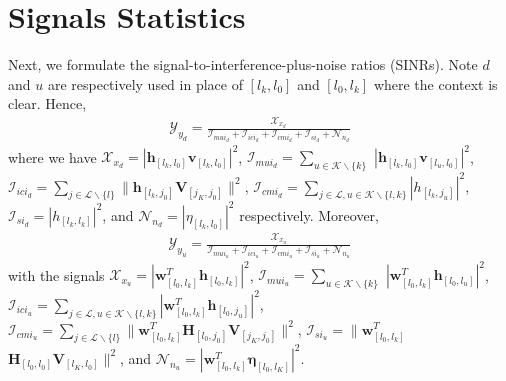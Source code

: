 \documentclass[onecolumn]{IEEEtran}
\begin{document}
\section{Signals Statistics}

Next, we formulate the signal-to-interference-plus-noise ratios (SINRs). Note $d$ and $u$ are respectively used in place of $[l_{k},l_{0}]$ and $[l_{0},l_{k}]$ where the context is clear. Hence,
\begin{align}
\mathcal{Y}_{y_{d}} = \frac{\mathcal{X}_{x_{d}}}{\mathcal{I}_{mui_{d}} + \mathcal{I}_{ici_{d}} + \mathcal{I}_{cmi_{d}} + \mathcal{I}_{si_{d}} + \mathcal{N}_{n_{d}}}
\end{align}
where we have $\mathcal{X}_{x_{d}} = | \boldsymbol{h}_{[l_{k},l_{0}]} \boldsymbol{v}_{[l_{k},l_{0}]} |^2$, $\mathcal{I}_{mui_{d}} = \sum_{u \in \mathcal{K} \backslash \{ k \}}$ $| \boldsymbol{h}_{[l_{k},l_{0}]} \boldsymbol{v}_{[l_{u},l_{0}]} |^2$, $\mathcal{I}_{ici_{d}} = 
\sum_{j \in \mathcal{L} \backslash \{ l \} } \| \boldsymbol{h}_{[l_{k},j_{0}]} \boldsymbol{V}_{[j_{K},j_{0}]} \|^2$, $\mathcal{I}_{cmi_{d}} =  \sum_{j \in \mathcal{L} , u \in \mathcal{K} \backslash \{ l,k \}} | h_{[l_{k},j_{u}]} |^2$, $\mathcal{I}_{si_{d}} =  | h_{[l_{k},l_{k}]} |^2$, and $\mathcal{N}_{n_{d}} = | \eta_{[l_{k},l_{0}]} |^{2}$ respectively. Moreover, 
\begin{align}
\mathcal{Y}_{y_{u}} = \frac{\mathcal{X}_{x_{u}}}{\mathcal{I}_{mui_{u}} + \mathcal{I}_{ici_{u}} + \mathcal{I}_{cmi_{u}} + \mathcal{I}_{si_{u}} + \mathcal{N}_{n_{u}}}
\end{align}
with the signals $\mathcal{X}_{x_{u}} =  | \boldsymbol{w}^{T}_{[l_{0},l_{k}]} \boldsymbol{h}_{[l_{0},l_{k}]} |^2$,
$\mathcal{I}_{mui_{u}} = \sum_{u \in \mathcal{K} \backslash \{ k \}}$ $| \boldsymbol{w}^{T}_{[l_{0},l_{k}]} \boldsymbol{h}_{[l_{0},l_{u}]} |^2$, $\mathcal{I}_{ici_{u}} = \sum_{j \in \mathcal{L}, u \in \mathcal{K} \backslash \{ l,k \}} | \boldsymbol{w}^{T}_{[l_{0},l_{k}]} \boldsymbol{h}_{[l_{0},j_{u}]} |^{2}$, $\mathcal{I}_{cmi_{u}} = \sum_{j \in \mathcal{L} \backslash \{ l \}} \| \boldsymbol{w}^{T}_{[l_{0},l_{k}]} \boldsymbol{H}_{[l_{0},j_{0}]} \boldsymbol{V}_{[j_{K},j_{0}]} \|^{2}$, $\mathcal{I}_{si_{u}} =  \| \boldsymbol{w}^{T}_{[l_{0},l_{k}]}$ $\boldsymbol{H}_{[l_{0},l_{0}]} \boldsymbol{V}_{[l_{K},l_{0}]} \|^{2}$, and $\mathcal{N}_{n_{u}} = | \boldsymbol{w}^{T}_{[l_{0},l_{k}]} \boldsymbol{\eta}_{[l_{0},l_{K}]} |^{2}$.
\end{document}
